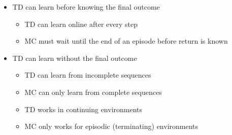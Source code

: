 \documentclass[10pt]{article}
\begin{document}
\begin{itemize}
\item TD can learn before knowing the final outcome
\begin{itemize}
\item TD can learn online after every step
\item MC must wait until the end of an episode before return is known
\end{itemize}
\item TD can learn without the final outcome
\begin{itemize}
\item TD can learn from incomplete sequences
\item MC can only learn from complete sequences
\item TD works in continuing environments
\item MC only works for episodic (terminating) environments
\end{itemize}
\end{itemize}
\end{document}
